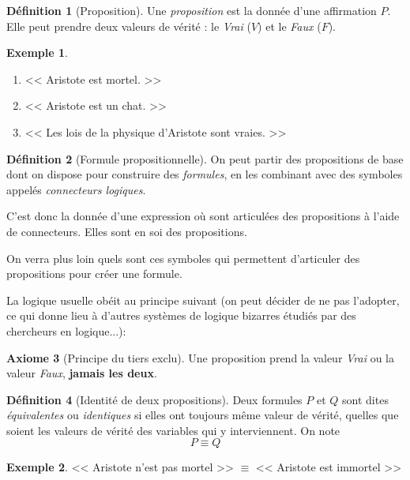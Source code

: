 \documentclass[11pt]{article}
\theoremstyle{definition}
\newtheorem{defn}{Définition}[section]
\newtheorem{axio}[defn]{Axiome}
\newtheorem{exe}{Exemple}
\theoremstyle{remark}
\begin{document}
\begin{defn}[Proposition]
Une \textit{proposition} est la donnée d'une affirmation $P$. Elle peut prendre deux valeurs de vérité : le \textit{Vrai} ($V$) et le \textit{Faux} ($F$).
\end{defn}

\begin{exe}\leavevmode
\begin{enumerate}
\item << Aristote est mortel. >>
\item << Aristote est un chat. >>
\item << Les lois de la physique d'Aristote sont vraies. >>
\end{enumerate}
\end{exe}

\begin{defn}[Formule propositionnelle]
On peut partir des propositions de base dont on dispose pour construire des \textit{formules}, en les combinant avec des symboles appelés \textit{connecteurs logiques}.

C'est donc la donnée d'une expression où sont articulées des propositions à l'aide de connecteurs. Elles sont en soi des propositions.
\end{defn}

On verra plus loin quels sont ces symboles qui permettent d'articuler des propositions pour créer une formule.



La logique usuelle obéit au principe suivant (on peut décider de ne pas l'adopter, ce qui donne lieu à d'autres systèmes de logique bizarres étudiés par des chercheurs en logique...):

\begin{axio}[Principe du tiers exclu]
Une proposition prend la valeur \textit{Vrai} ou la valeur \textit{Faux}, \textbf{jamais les deux}.
\end{axio}

\begin{defn}[Identité de deux propositions]
Deux formules $P$ et $Q$ sont dites \textit{équivalentes} ou \textit{identiques} si elles ont toujours même valeur de vérité, quelles que soient les valeurs de vérité des variables qui y interviennent. On note
\[P\equiv Q
\]
\end{defn}

\begin{exe}\leavevmode
<< Aristote n'est pas mortel >> $\equiv$ << Aristote est immortel >>
\end{exe}
\end{document}
